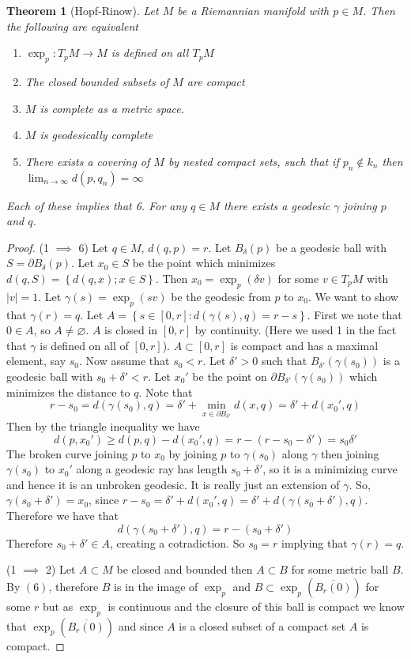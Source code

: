 \documentclass[a4paper]{article}
\newtheorem*{thm}{Theorem}
\begin{document}
\begin{thm}[Hopf-Rinow]
 Let $M$ be a Riemannian manifold with $p \in M$. Then the following are equivalent  
 \begin{enumerate}
   \item $\exp_p:T_pM \rightarrow M$ is defined on all $T_pM$ 
   \item The closed bounded subsets of $M$ are compact 
   \item $M$ is complete as a metric space.
   \item $M$ is geodesically complete
   \item There exists a covering of $M$ by nested compact sets, such that if $p_n \notin k_n$ then $\lim_{n \rightarrow \infty} d(p,q_n) = \infty$
 \end{enumerate}
 Each of these implies that 6. For any $q \in M$ there exists a geodesic  $\gamma$ joining $p$ and $q$.
\end{thm}

\begin{proof}
  (1 $\implies$ 6) Let $q \in M$, $d(q,p) = r$. Let $B_{\delta}(p)$ be a geodesic ball with $S = \partial B_{\delta}(p)$. Let $x_0 \in S$ be the point which minimizes $d(q,S) = \left\{ d(q,x); x \in S \right\}$. Then $x_0 = \exp_p(\delta v)$ for some $v \in T_pM$ with $|v|=1$. Let $\gamma(s) = \exp_p(sv)$ be the geodesic from $p$ to $x_0$. We want to show that $\gamma(r) = q$. Let $A = \left\{ s \in \left[ 0,r \right]: d(\gamma(s), q) = r-s \right\}$. First we note that $0 \in A$, so $A \neq \varnothing$. $A$ is closed in $[0,r]$ by continuity. (Here we used 1 in the fact that $\gamma$ is defined on all of $[0,r]$). $A \subset [0,r]$ is compact and has a maximal element, say $s_0$. Now assume that $s_0 < r$. Let $\delta'> 0$  such that $B_{\delta'}(\gamma(s_0))$ is a geodesic ball with $s_0 + \delta' < r$. Let $x_0'$ be the point on $\partial B_{\delta'}(\gamma(s_0))$ which minimizes the distance to $q$. Note that 
\[
  r - s_0 =  d(\gamma(s_0), q) = \delta' + \min_{x\in \partial B_{\delta'}} d(x,q) = \delta' + d(x_0', q)
\]
Then by the triangle inequality we have
\[
  d(p,x_0') \geq d(p,q) - d(x_0',q) = r - (r - s_0 - \delta') = s_0 \delta'
\]
The broken curve joining $p$ to $x_0$ by joining $p$ to $\gamma(s_0)$ along $\gamma$ then joining $\gamma(s_0)$ to $x_0'$ along a geodesic ray has length $s_0 + \delta'$, so it is a minimizing curve and hence it is an unbroken geodesic. It is really just an extension of $\gamma$. So, $\gamma(s_0 + \delta') = x_0$, since $r - s_0 = \delta' + d(x_0',q) = \delta' + d(\gamma(s_0 + \delta'), q)$. Therefore we have that
\[
  d(\gamma(s_0 + \delta'), q) = r - (s_0 + \delta')
\]
Therefore $s_0 + \delta' \in A$, creating a cotradiction. So $s_0 = r$ implying that $\gamma(r) = q$.

(1 $\implies$ 2) Let $A \subset M$ be closed and bounded then $A \subset B$ for some metric ball $B$. By $(6)$, therefore $B$ is in the image of $\exp_p$ and $B \subset \exp_p\left(\overline{B_r(0)}\right)$ for some $r$ but as $\exp_p$ is continuous and the closure of this ball is compact we know that $\exp_p \left( \overline{B_r(0)} \right)$ and since $A$ is a closed subset of a compact set $A$ is compact.
\end{proof}
\end{document}
